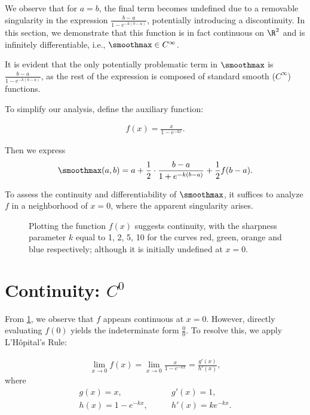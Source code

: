 We observe that for $a = b$, the final term becomes undefined due to a removable singularity in the expression $\frac{b - a}{1 - e^{-k(b - a)}}$, potentially introducing a discontinuity. In this section, we demonstrate that this function is in fact continuous on $\R^2$ and is infinitely differentiable, i.e., $\smoothmax \in C^\infty$.

It is evident that the only potentially problematic term in $\smoothmax$ is $\frac{b - a}{1 - e^{-k(b - a)}}$, as the rest of the expression is composed of standard smooth ($C^\infty$) functions.

To simplify our analysis, define the auxiliary function:

\begin{align}
    f(x) = \frac{x}{1 - e^{-kx}}.
\end{align}

Then we express
\begin{align}
    \smoothmax(a, b) = a + \frac{1}{2} \cdot \frac{b - a}{1 + e^{-k(b - a)}} + \frac{1}{2} f(b - a).
\end{align}

To assess the continuity and differentiability of $\smoothmax$, it suffices to analyze $f$ in a neighborhood of $x = 0$, where the apparent singularity arises.

\begin{figure}
    \caption[Plot of $f(x)$]{Plotting the function $f(x)$ suggests continuity, with the sharpness parameter $k$ equal to 1, 2, 5, 10 for the curves red, green, orange and blue respectively; although it is initially undefined at $x = 0$.}
    \label{fig:smoothmax-f-plot}
\end{figure}

\section{Continuity: $C^0$}

From \cref{fig:smoothmax-f-plot}, we observe that $f$ appears continuous at $x = 0$. However, directly evaluating $f(0)$ yields the indeterminate form $\frac{0}{0}$. To resolve this, we apply L'Hôpital's Rule:

\begin{align}
    \lim_{x \to 0} f(x) = \lim_{x \to 0} \frac{x}{1 - e^{-kx}} = \frac{g'(x)}{h'(x)},
\end{align}
where
\begin{align}
    g(x) = x, \quad & \quad g'(x) = 1, \\
    h(x) = 1 - e^{-kx}, \quad & \quad h'(x) = k e^{-kx}.
\end{align}

